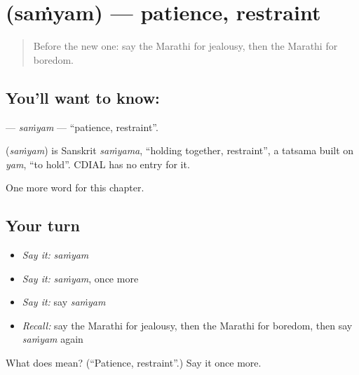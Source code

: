 \section[\texorpdfstring{\mr{संयम} (saṁyam)}{संयम (saṁyam)}]{ (saṁyam) — patience, restraint}

\label{lesson:MR-C170-samyam}



\begin{quote}
Before the new one: say the Marathi for jealousy, then the Marathi for boredom.
\end{quote}

\subsection*{You'll want to know: }
\textbf{} — \emph{saṁyam} — \textquotedblleft{}patience, restraint\textquotedblright{}.

\begin{cousinweb}
\textbf{} (\emph{saṁyam}) is Sanskrit \emph{saṁyama}, \textquotedblleft{}holding together, restraint\textquotedblright{}, a tatsama built on \emph{yam}, \textquotedblleft{}to hold\textquotedblright{}. CDIAL has no entry for it.
\end{cousinweb}

\begin{grammarlens}[title={What you've built}]
One more word for this chapter.
\end{grammarlens}

\subsection*{Your turn}
\begin{itemize}
\raggedright
  \item \emph{Say it:} \emph{saṁyam}
  \item \emph{Say it:} \emph{saṁyam}, once more
  \item \emph{Say it:} say \emph{saṁyam}
  \item \emph{Recall:} say the Marathi for jealousy, then the Marathi for boredom, then say \emph{saṁyam} again
\end{itemize}

\begin{tcolorbox}[breakable,colback=teal!4,colframe=teal!35!black,title={Before you move on}]
What does  mean? (\textquotedblleft{}Patience, restraint\textquotedblright{}.) Say it once more.
\end{tcolorbox}
